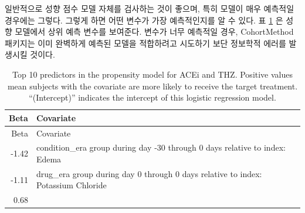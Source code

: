 \documentclass[11pt]{book}
\theoremstyle{definition}
\theoremstyle{definition}
\theoremstyle{definition}
\theoremstyle{remark}
\begin{document}
일반적으로 성향 점수 모델 자체를 검사하는 것이 좋으며, 특히 모델이 매우
예측적일 경우에는 그렇다. 그렇게 하면 어떤 변수가 가장 예측적인지를 알
수 있다. 표 \ref{tab:psModel} 은 성향 모델에서 상위 예측 변수를
보여준다. 변수가 너무 예측적일 경우, CohortMethod 패키지는 이미 완벽하게
예측된 모델을 적합하려고 시도하기 보단 정보학적 에러를 발생시킬 것이다.

\begin{longtable}[]{@{}rl@{}}
\caption{\label{tab:psModel} Top 10 predictors in the propensity model for
ACEi and THZ. Positive values mean subjects with the covariate are more
likely to receive the target treatment. ``(Intercept)'' indicates the
intercept of this logistic regression model.}\tabularnewline
\toprule
\begin{minipage}[b]{0.07\columnwidth}\raggedleft\strut
Beta\strut
\end{minipage} & \begin{minipage}[b]{0.87\columnwidth}\raggedright\strut
Covariate\strut
\end{minipage}\tabularnewline
\midrule
\endfirsthead
\toprule
\begin{minipage}[b]{0.07\columnwidth}\raggedleft\strut
Beta\strut
\end{minipage} & \begin{minipage}[b]{0.87\columnwidth}\raggedright\strut
Covariate\strut
\end{minipage}\tabularnewline
\midrule
\endhead
\begin{minipage}[t]{0.07\columnwidth}\raggedleft\strut
-1.42\strut
\end{minipage} & \begin{minipage}[t]{0.87\columnwidth}\raggedright\strut
condition\_era group during day -30 through 0 days relative to index:
Edema\strut
\end{minipage}\tabularnewline
\begin{minipage}[t]{0.07\columnwidth}\raggedleft\strut
-1.11\strut
\end{minipage} & \begin{minipage}[t]{0.87\columnwidth}\raggedright\strut
drug\_era group during day 0 through 0 days relative to index: Potassium
Chloride\strut
\end{minipage}\tabularnewline
\begin{minipage}[t]{0.07\columnwidth}\raggedleft\strut
0.68\strut
\end{minipage} & \begin{minipage}[t]{0.87\columnwidth}\raggedright\strut

\end{minipage}
\end{longtable}
\end{document}
